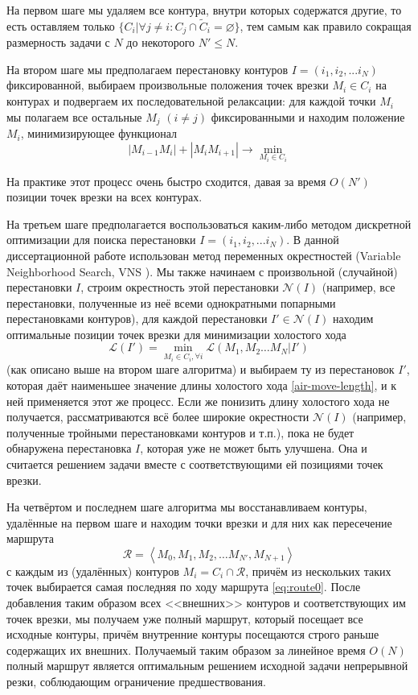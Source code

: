 На первом шаге мы удаляем все контура,
внутри которых содержатся другие,
то есть оставляем только
$
\{C_i \vert \forall j \ne i\colon C_j \cap \widetilde C_i = \varnothing \}
$,
тем самым как правило сокращая размерность задачи с $N$
до некоторого $N' \leqslant N$.

На втором шаге мы предполагаем перестановку контуров
$I = (i_1, i_2, ... i_N)$
фиксированной,
выбираем произвольные положения точек врезки
$M_i \in C_i$ на контурах и подвергаем их последовательной релаксации:
для каждой точки $M_i$
мы полагаем все остальные $M_j$ $(i\ne j)$ фиксированными и находим
положение $M_i$, минимизирующее функционал
$$
|M_{i-1}M_i|+|M_iM_{i+1}| \to \min_{M_i \in C_i}
$$

На практике этот процесс очень быстро сходится,
давая за время $O(N')$
позиции точек врезки на всех контурах.

На третьем шаге предполагается воспользоваться каким-либо
методом дискретной оптимизации для поиска перестановки
$I = (i_1, i_2, ... i_N)$.
В данной диссертационной работе использован метод
переменных окрестностей
(Variable Neighborhood Search,
VNS
\autocite{bi:VNS}).
Мы также начинаем с произвольной
(случайной) перестановки $I$,
строим окрестность этой перестановки
$\mathcal N(I)$
(например, все перестановки,
полученные из неё всеми однократными попарными перестановками контуров),
для каждой перестановки $I'\in \mathcal N(I)$
находим оптимальные позиции точек врезки
для минимизации холостого хода
$$
\mathcal L (I') = \min_{M_i\in C_i, \forall i}
  \mathcal L (M_1, M_2 \dots M_N | I')
$$
(как описано выше на втором шаге алгоритма)
и выбираем ту из перестановок $I'$,
которая даёт наименьшее значение длины
холостого хода \eqref{air-move-length},
и к ней применяется этот же процесс.
Если же понизить длину холостого хода не получается,
рассматриваются всё более широкие окрестности
$\mathcal N(I)$
(например, полученные тройными перестановками контуров
и т.п.),
пока не будет обнаружена перестановка $I$,
которая уже не может быть улучшена.
Она и считается решением задачи
вместе с соответствующими ей позициями точек врезки.

На четвёртом и последнем шаге алгоритма
мы восстанавливаем контуры,
удалённые на первом шаге и находим точки
врезки и для них как пересечение маршрута
\begin{equation}
  \label{eq:route0}
  \mathcal R = \left< M_0, M_1, M_2, \dots M_{N'}, M_{N+1}\right>
\end{equation}
с каждым из (удалённых) контуров
$M_i = C_i \cap \mathcal R$,
причём из нескольких таких точек
выбирается самая последняя по ходу маршрута
\eqref{eq:route0}.
После добавления таким образом всех
<<внешних>> контуров
и соответствующих им точек врезки,
мы получаем уже полный маршрут,
который посещает все исходные контуры,
причём внутренние контуры посещаются
строго раньше содержащих их внешних.
Получаемый таким образом
за линейное время
$O(N)$
полный маршрут
является оптимальным решением исходной задачи
непрерывной резки,
соблюдающим
ограничение предшествования.

